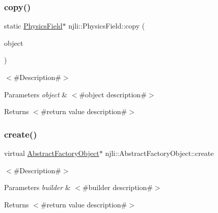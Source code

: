 \subsubsection{\texorpdfstring{copy()}{copy()}}
{\footnotesize\ttfamily static \mbox{\hyperlink{classnjli_1_1_physics_field}{Physics\+Field}}$\ast$ njli\+::\+Physics\+Field\+::copy (\begin{DoxyParamCaption}\item[{const \mbox{\hyperlink{classnjli_1_1_physics_field}{Physics\+Field}} \&}]{object }\end{DoxyParamCaption})\hspace{0.3cm}{\ttfamily [static]}}

$<$\#\+Description\#$>$


\begin{DoxyParams}{Parameters}
{\em object} & $<$\#object description\#$>$\\
\hline
\end{DoxyParams}
\begin{DoxyReturn}{Returns}
$<$\#return value description\#$>$ 
\end{DoxyReturn}
\mbox{\label{classnjli_1_1_physics_field_a83a8876ae63b92804004cf3febe76573}} 
\subsubsection{\texorpdfstring{create()}{create()}\hspace{0.1cm}{\footnotesize\ttfamily [1/3]}}
{\footnotesize\ttfamily virtual \mbox{\hyperlink{classnjli_1_1_abstract_factory_object}{Abstract\+Factory\+Object}}$\ast$ njli\+::\+Abstract\+Factory\+Object\+::create}

$<$\#\+Description\#$>$


\begin{DoxyParams}{Parameters}
{\em builder} & $<$\#builder description\#$>$\\
\hline
\end{DoxyParams}
\begin{DoxyReturn}{Returns}
$<$\#return value description\#$>$ 
\end{DoxyReturn}
\mbox{\label{classnjli_1_1_physics_field_a3e58b5592e7ce80d50b9a0a74ee55782}} 
